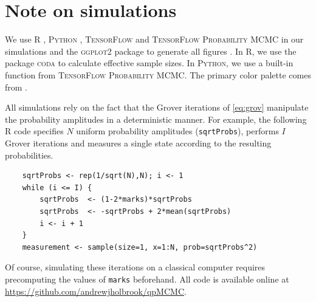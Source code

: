 \documentclass[12pt]{article} %
\begin{document}
\section{Note on simulations}\label{sec:sim}

We use \textsc{R} \citep{rlang}, \textsc{Python} \citep{vanrossum1995python}, \textsc{TensorFlow} \citep{abadi2016tensorflow} and  \textsc{TensorFlow Probability MCMC} \citep{lao2020tfp} in our simulations and the \textsc{ggplot2} package to generate all figures \citep{ggplot}.   In \textsc{R}, we use the package \textsc{coda} \citep{coda} to calculate effective sample sizes.  In \textsc{Python}, we use a built-in function from \textsc{TensorFlow Probability MCMC}.  The primary color palette comes from \citet{wes}.

All simulations rely on the fact that the Grover iterations of \eqref{eq:grov} manipulate the probability amplitudes in a deterministic manner. For example, the following \textsc{R} code specifies $N$ uniform probability amplitudes (\verb|sqrtProbs|), performs $I$ Grover iterations and measures a single state according to the resulting probabilities.
\begin{verbatim}
	sqrtProbs <- rep(1/sqrt(N),N); i <- 1
	while (i <= I) {
		sqrtProbs  <- (1-2*marks)*sqrtProbs
		sqrtProbs  <- -sqrtProbs + 2*mean(sqrtProbs)
		i <- i + 1
	}
	measurement <- sample(size=1, x=1:N, prob=sqrtProbs^2)
\end{verbatim}
Of course, simulating these iterations on a classical computer requires precomputing the values of \verb|marks| beforehand.   All code is available online at \url{https://github.com/andrewjholbrook/qpMCMC}.






\end{document}
